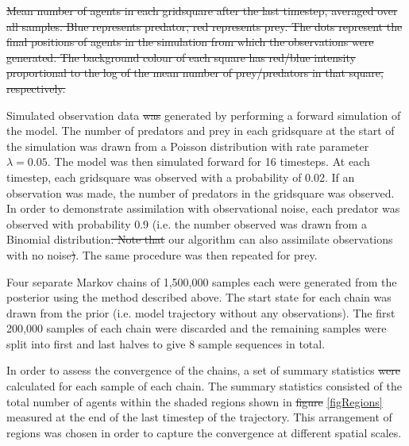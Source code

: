 \documentclass{article}
\providecommand{\DIFaddtex}[1]{{\protect\color{blue}\uwave{#1}}} %
\providecommand{\DIFdeltex}[1]{{\protect\color{red}\sout{#1}}}                      %
\providecommand{\DIFaddbegin}{} %
\providecommand{\DIFaddend}{} %
\providecommand{\DIFdelbegin}{} %
\providecommand{\DIFdelend}{} %
\providecommand{\DIFdelFL}[1]{\DIFdel{#1}} %
\providecommand{\DIFadd}[1]{\texorpdfstring{\DIFaddtex{#1}}{#1}} %
\providecommand{\DIFdel}[1]{\texorpdfstring{\DIFdeltex{#1}}{}} %
\newcommand{\DIFscaledelfig}{0.5}
\newlength{\DIFdelgraphicswidth} %
\newlength{\DIFdelgraphicsheight} %
\newcommand{\DIFaddincludegraphics}[2][]{{\color{blue}\fbox{\DIFOincludegraphics[#1]{#2}}}} %
\newcommand{\DIFdelincludegraphics}[2][]{%
\sbox{\DIFdelgraphicsbox}{\DIFOincludegraphics[#1]{#2}}%
\settoboxwidth{\DIFdelgraphicswidth}{\DIFdelgraphicsbox} %
\settoboxtotalheight{\DIFdelgraphicsheight}{\DIFdelgraphicsbox} %
\scalebox{\DIFscaledelfig}{%
\parbox[b]{\DIFdelgraphicswidth}{\usebox{\DIFdelgraphicsbox}\\[-\baselineskip] \rule{\DIFdelgraphicswidth}{0em}}\llap{\resizebox{\DIFdelgraphicswidth}{\DIFdelgraphicsheight}{%
\setlength{\unitlength}{\DIFdelgraphicswidth}%
\begin{picture}(1,1)%
\thicklines\linethickness{2pt} %
{\color[rgb]{1,0,0}\put(0,0){\framebox(1,1){}}}%
{\color[rgb]{1,0,0}\put(0,0){\line( 1,1){1}}}%
{\color[rgb]{1,0,0}\put(0,1){\line(1,-1){1}}}%
\end{picture}%
}\hspace*{3pt}}} %
} %
\DeclareRobustCommand{\DIFaddbegin}{\DIFOaddbegin \let\includegraphics\DIFaddincludegraphics} %
\DeclareRobustCommand{\DIFaddend}{\DIFOaddend \let\includegraphics\DIFOincludegraphics} %
\DeclareRobustCommand{\DIFdelbegin}{\DIFOdelbegin \let\includegraphics\DIFdelincludegraphics} %
\DeclareRobustCommand{\DIFdelend}{\DIFOaddend \let\includegraphics\DIFOincludegraphics} %
\begin{document}
{%
\DIFdelFL{Mean number of agents in each gridsquare after the last timestep, averaged over all samples. Blue represents predator, red represents prey. The dots represent the final positions of agents in the simulation from which the observations were generated. The background colour of each square has red/blue intensity proportional to the log of the mean number of prey/predators in that square, respectively.}}

\DIFdelend Simulated observation data \DIFdelbegin \DIFdel{was }\DIFdelend \DIFaddbegin \DIFadd{were }\DIFaddend generated by performing a forward simulation of the model. The number of predators and prey in each gridsquare at the start of the simulation was drawn from a Poisson distribution with rate parameter $\lambda = 0.05$. The model was then simulated forward for 16 timesteps. At each timestep, each gridsquare was observed with a probability of 0.02. If an observation was made, the number of predators in the gridsquare was observed. In order to demonstrate assimilation with observational noise, each predator was observed with probability 0.9 (i.e. the number observed was drawn from a Binomial distribution\DIFdelbegin \DIFdel{. Note that }\DIFdelend \DIFaddbegin \DIFadd{) although }\DIFaddend our algorithm can also assimilate observations with no noise\DIFdelbegin \DIFdel{)}\DIFdelend . The same procedure was then repeated for prey.

Four separate Markov chains of 1,500,000 samples each were generated from the posterior using the method described above. The start state for each chain was drawn from the prior (i.e. model trajectory without any observations). The first 200,000 samples of each chain were discarded and the remaining samples were split into first and last halves to give 8 sample sequences in total. 

In order to assess the convergence of the chains, a set of summary statistics \DIFdelbegin \DIFdel{were }\DIFdelend \DIFaddbegin \DIFadd{was }\DIFaddend calculated for each sample of each chain. The summary statistics consisted of the total number of agents within the shaded regions shown in \DIFdelbegin \DIFdel{figure }\DIFdelend \DIFaddbegin \DIFadd{Figure~}\DIFaddend \ref{figRegions} measured at the end of the last timestep of the trajectory. This arrangement of regions was chosen in order to capture the convergence at different spatial scales.
\DIFaddbegin 
\end{document}
